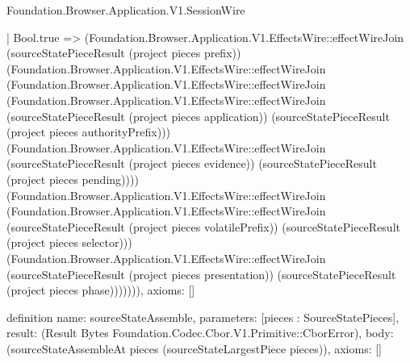 \begin{lexlean}{Foundation.Browser.Application.V1.SessionWire}
\begin{semanticmodule}
{    | Bool.true => (Foundation.Browser.Application.V1.EffectsWire::effectWireJoin (sourceStatePieceResult (project pieces prefix)) (Foundation.Browser.Application.V1.EffectsWire::effectWireJoin (Foundation.Browser.Application.V1.EffectsWire::effectWireJoin (Foundation.Browser.Application.V1.EffectsWire::effectWireJoin (sourceStatePieceResult (project pieces application)) (sourceStatePieceResult (project pieces authorityPrefix))) (Foundation.Browser.Application.V1.EffectsWire::effectWireJoin (sourceStatePieceResult (project pieces evidence)) (sourceStatePieceResult (project pieces pending)))) (Foundation.Browser.Application.V1.EffectsWire::effectWireJoin (Foundation.Browser.Application.V1.EffectsWire::effectWireJoin (sourceStatePieceResult (project pieces volatilePrefix)) (sourceStatePieceResult (project pieces selector))) (Foundation.Browser.Application.V1.EffectsWire::effectWireJoin (sourceStatePieceResult (project pieces presentation)) (sourceStatePieceResult (project pieces phase))))))),
  axioms: []
}

definition{
  name: sourceStateAssemble,
  parameters: [pieces : SourceStatePieces],
  result: (Result Bytes Foundation.Codec.Cbor.V1.Primitive::CborError),
  body: (sourceStateAssembleAt pieces (sourceStateLargestPiece pieces)),
  axioms: []
}


\end{semanticmodule}
\end{lexlean}
